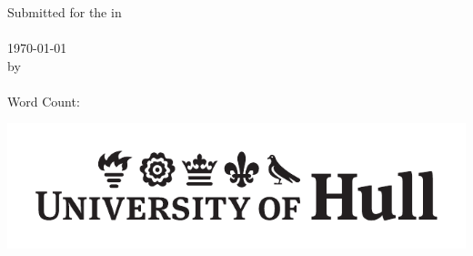 \makeatletter
\begin{titlepage}

\vspace*{-5em}
~~

\vfill

\begin{center}
{\huge \textbf{\@title}}\\
\vspace*{1em}
{\LARGE \textbf{\reporttype{}}}\\
\vspace*{2em}
{\Large Submitted for the \degreetitle{} in}\\
\vspace*{0.5em}
{\Large \progname{}}\\
\vspace*{2em}
{\Large \today}\\
\vspace*{2em}
{\Large by}\\
\vspace*{2em}
{\Large \textbf{\@author}}\\
\vspace*{3em}
{\large Word Count: \wordcount{}}
\end{center}

\vfill
\begin{center}
	\includegraphics[height=0.075\textheight]{title_page/UoH_Logo.pdf}
\end{center}

\end{titlepage}
\makeatother